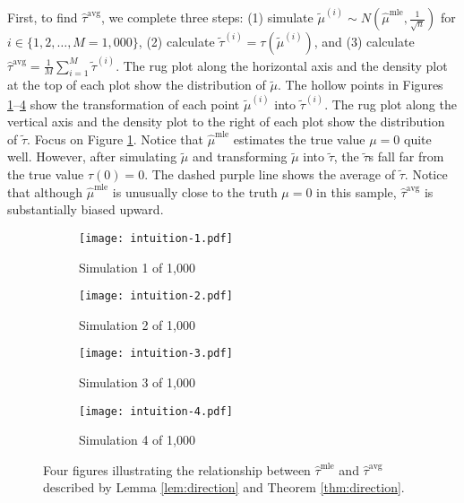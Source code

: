 \documentclass[11pt]{article}
\begin{document}
First, to find $\hat{\tau}^\text{avg}$, we complete three steps: (1) simulate $\tilde{\mu}^{(i)} \sim N \left( \hat{\mu}^\text{mle}, \frac{1}{\sqrt{n}} \right)$ for $i \in \{1, 2,\ldots, M = 1,000\}$, (2) calculate $\tilde{\tau}^{(i)} = \tau\left( \tilde{\mu}^{(i)} \right)$, and (3) calculate $\hat{\tau}^\text{avg} = \frac{1}{M} \sum_{i = 1}^M \tilde{\tau}^{(i)}$.
The rug plot along the horizontal axis and the density plot at the top of each plot show the distribution of $\tilde{\mu}$.
The hollow points in Figures \ref{fig:int1}--\ref{fig:int4} show the transformation of each point $\tilde{\mu}^{(i)}$ into $\tilde{\tau}^{(i)}$.
The rug plot along the vertical axis and the density plot to the right of each plot show the distribution of $\tilde{\tau}$.
Focus on Figure \ref{fig:int1}. Notice that $\hat{\mu}^\text{mle}$ estimates the true value $\mu = 0$ quite well. However, after simulating $\tilde{\mu}$ and transforming $\tilde{\mu}$ into $\tilde{\tau}$, the $\tilde{\tau}$s fall far from the true value $\tau(0) = 0$. The dashed purple line shows the average of $\tilde{\tau}$. Notice that although $\hat{\mu}^\text{mle}$ is unusually close to the truth $\mu = 0$ in this sample, $\hat{\tau}^\text{avg}$ is substantially biased upward.

\begin{figure}
\begin{subfigure}{.5\textwidth}
  \centering
  \texttt{[image: intuition-1.pdf]}
  \caption{Simulation 1 of 1,000}
  \label{fig:int1}
\end{subfigure}%
\begin{subfigure}{.5\textwidth}
  \centering
  \texttt{[image: intuition-2.pdf]}
  \caption{Simulation 2 of 1,000}
  \label{fig:int2}
\end{subfigure}
\begin{subfigure}{.5\textwidth}
  \centering
  \texttt{[image: intuition-3.pdf]}
  \caption{Simulation 3 of 1,000}
  \label{fig:int3}
\end{subfigure}%
\begin{subfigure}{.5\textwidth}
  \centering
  \texttt{[image: intuition-4.pdf]}
  \caption{Simulation 4 of 1,000}
  \label{fig:int4}
\end{subfigure}

\vspace{.1in}
\caption{Four figures illustrating the relationship between $\hat{\tau}^\text{mle}$ and $\hat{\tau}^\text{avg}$ described by Lemma \ref{lem:direction} and Theorem \ref{thm:direction}.}
\label{fig:int}
\end{figure}
\end{document}
